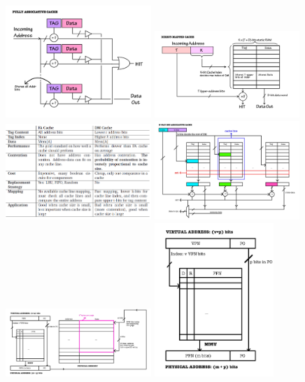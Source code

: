 \documentclass[8pt,landscape]{extarticle}
\begin{document}
\begin{multicols*}{5}
\includegraphics[width = 5.5cm]{FA_cache}
\includegraphics[width = 5.5cm]{DM_cache}
\includegraphics[width = 5.5cm]{cache_comparison}
\includegraphics[width = 5.5cm]{N_way_cache}
\includegraphics[width = 5.5cm]{Page_map}
\includegraphics[width = 4.5cm]{MMU}

\end{multicols*}
\end{document}
